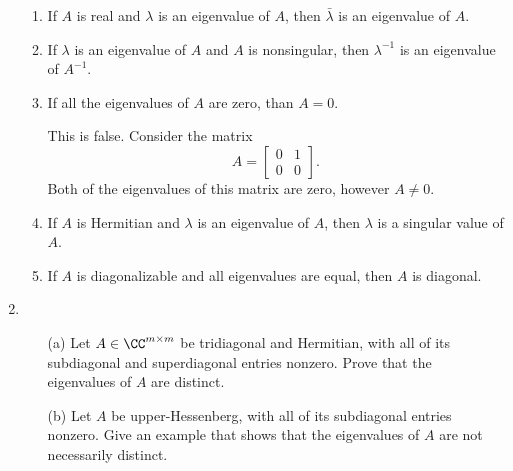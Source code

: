 \documentclass[11pt]{article}
\begin{document}
\begin{enumerate}
\begin{enumerate}
            \item
                If $A$ is real and $\lambda$ is an eigenvalue of $A$, then
                $\bar{\lambda}$ is an eigenvalue of $A$.

            \item
                If $\lambda$ is an eigenvalue of $A$ and $A$ is nonsingular, then
                $\lambda^{-1}$ is an eigenvalue of $A^{-1}$.

            \item %
                If all the eigenvalues of $A$ are zero, than $A = 0$.

                This is false.
                Consider the matrix
                \[
                    A =
                    \begin{bmatrix}
                        0 & 1 \\
                        0 & 0
                    \end{bmatrix}.
                \]
                Both of the eigenvalues of this matrix are zero, however
                $A \neq 0$.

            \item
                If $A$ is Hermitian and $\lambda$ is an eigenvalue of $A$, then
                $\lambda$ is a singular value of $A$.

            \item
                If $A$ is diagonalizable and all eigenvalues are equal, then $A$
                is diagonal.
        \end{enumerate}

    \item %
        \begin{enumerate}
            \item[(a)]
                Let $A \in \CC^{m \times m}$ be tridiagonal and Hermitian, with
                all of its subdiagonal and superdiagonal entries nonzero.
                Prove that the eigenvalues of $A$ are distinct.


            \item[(b)]
                Let $A$ be upper-Hessenberg, with all of its subdiagonal entries
                nonzero.
                Give an example that shows that the eigenvalues of $A$ are
                not necessarily distinct.
        \end{enumerate}


\end{enumerate}
\end{document}
